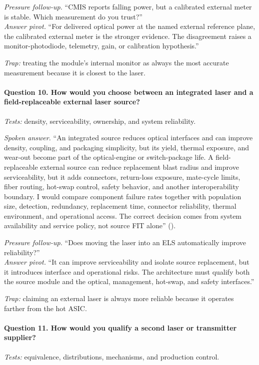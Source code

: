 \textit{Pressure follow-up.} ``CMIS reports falling power, but a calibrated
external meter is stable. Which measurement do you trust?''\\
\textit{Answer pivot.} ``For delivered optical power at the named external
reference plane, the calibrated external meter is the stronger evidence. The
disagreement raises a monitor-photodiode, telemetry, gain, or calibration
hypothesis.''

\textit{Trap:} treating the module's internal monitor as always the most
accurate measurement because it is closest to the laser.

\paragraph{Question 10. How would you choose between an integrated laser and a
field-replaceable external laser source?}
\textit{Tests:} density, serviceability, ownership, and system reliability.

\textit{Spoken answer.}
``An integrated source reduces optical interfaces and can improve density,
coupling, and packaging simplicity, but its yield, thermal exposure, and
wear-out become part of the optical-engine or switch-package life. A
field-replaceable external source can reduce replacement blast radius and
improve serviceability, but it adds connectors, return-loss exposure,
mate-cycle limits, fiber routing, hot-swap control, safety behavior, and
another interoperability boundary. I would compare component failure rates
together with population size, detection, redundancy, replacement time,
connector reliability, thermal environment, and operational access. The correct
decision comes from system availability and service policy, not source FIT
alone'' ().

\textit{Pressure follow-up.} ``Does moving the laser into an ELS automatically
improve reliability?''\\
\textit{Answer pivot.} ``It can improve serviceability and isolate source
replacement, but it introduces interface and operational risks. The
architecture must qualify both the source module and the optical, management,
hot-swap, and safety interfaces.''

\textit{Trap:} claiming an external laser is always more reliable because it
operates farther from the hot ASIC.

\paragraph{Question 11. How would you qualify a second laser or transmitter
supplier?}
\textit{Tests:} equivalence, distributions, mechanisms, and production control.

